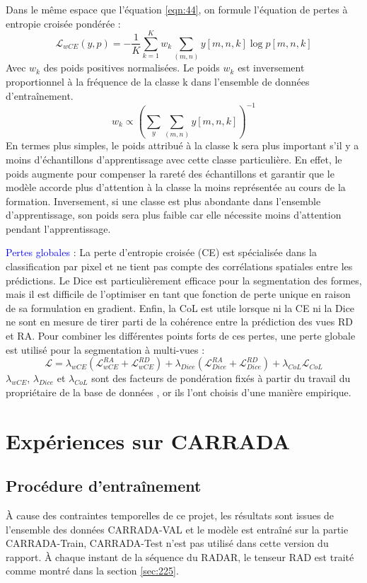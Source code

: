 Dans le même espace que l'équation \ref{eqn:44}, on formule l'équation de pertes à entropie croisée pondérée : 
\begin{equation}
  \mathcal{L}_{wCE}(y,p)= -\frac{1}{K} \sum_{k=1}^{K} w_k \sum_{(m,n)}y[m,n,k] \log p[m,n,k]
\end{equation}
Avec $w_k$ des poids positives normalisées. Le poids $w_k$ est inversement proportionnel à la fréquence de la classe k dans l'ensemble de données d'entraînement. 
\begin{equation}
  w_k \varpropto (\sum_y \sum_{(m,n)} y[m,n,k])^{-1}
\end{equation}
En termes plus simples, le poids attribué à la classe k sera plus important s'il y a moins d'échantillons d'apprentissage avec cette classe particulière. En effet, le poids augmente pour compenser la rareté des échantillons et garantir que le modèle accorde plus d'attention à la classe la moins représentée au cours de la formation. Inversement, si une classe est plus abondante dans l'ensemble d'apprentissage, son poids sera plus faible car elle nécessite moins d'attention pendant l'apprentissage.

\textcolor{blue}{Pertes globales} : La perte d'entropie croisée (CE) est spécialisée dans la classification par pixel et ne tient pas compte des corrélations spatiales entre les prédictions. Le Dice est particulièrement efficace pour la segmentation des formes, mais il est difficile de l'optimiser en tant que fonction de perte unique en raison de sa formulation en gradient. Enfin, la CoL est utile lorsque ni la CE ni la Dice ne sont en mesure de tirer parti de la cohérence entre la prédiction des vues RD et RA. Pour combiner les différentes points forts de ces pertes, une perte globale est utilisé pour la segmentation à multi-vues :
\begin{equation}
  \mathcal{L} = \lambda_{wCE}(\mathcal{L}_{wCE}^{RA}+\mathcal{L}_{wCE}^{RD})+\lambda_{Dice}(\mathcal{L}_{Dice}^{RA}+\mathcal{L}_{Dice}^{RD})+\lambda_{CoL}\mathcal{L}_{CoL}
\end{equation}
$\lambda_{wCE}$, $\lambda_{Dice}$ et $\lambda_{CoL}$ sont des facteurs de pondération fixés à partir du travail du propriétaire de la base de données \cite{25}, or ils l'ont choisis d'une manière empirique.

\section{Expériences sur CARRADA}
\subsection{Procédure d'entraînement}
À cause des contraintes temporelles de ce projet, les résultats sont issues de l'ensemble des données CARRADA-VAL et le modèle est entraîné sur la partie CARRADA-Train, CARRADA-Test n'est pas utilisé dans cette version du rapport. À chaque instant de la séquence du RADAR, le tenseur RAD est traité comme montré dans la section \ref{sec:225}. 

